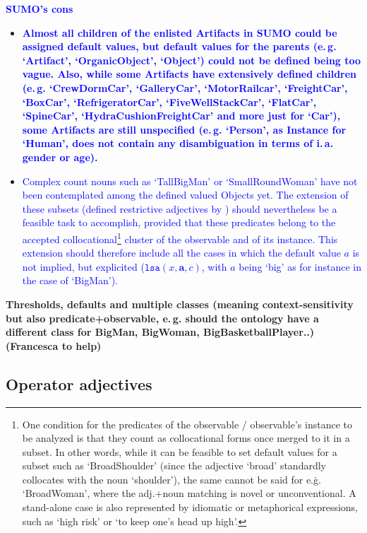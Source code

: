 \documentclass[11pt]{article}
\newcommand{\crossed}{\item[$\times$]}
\begin{document}
\textbf{\textcolor{blue}{SUMO's cons}}
\begin{itemize}
\crossed \textbf{\textcolor{blue}{Almost all children of the enlisted Artifacts in SUMO could be assigned default values, but default values for the parents (e.\,g. `Artifact', `OrganicObject', `Object') could not be defined being too vague. Also, while some Artifacts have extensively defined children (e.\,g. `CrewDormCar', `GalleryCar', `MotorRailcar', `FreightCar', `BoxCar', `RefrigeratorCar', `FiveWellStackCar', `FlatCar', `SpineCar', `HydraCushionFreightCar' and more just for `Car'), some Artifacts are still unspecified (e.\,g. `Person', as Instance for `Human', does not contain any disambiguation in terms of i.\,a. gender or age).}}

\crossed \textcolor{blue}{Complex count nouns such as `TallBigMan' or `SmallRoundWoman' have not been contemplated among the defined valued Objects yet. The extension of these subsets (defined restrictive adjectives by \cite{Bennett06kr}) should nevertheless be a feasible task to accomplish, provided that these predicates belong to the accepted collocational\footnote{One condition for the predicates of the observable / observable's instance to be analyzed is that they count as collocational forms once merged to it in a subset. In other words, while it can be feasible to set default values for a subset such as `BroadShoulder' (since the adjective `broad' standardly collocates with the noun `shoulder'), the same cannot be said for e.\.g. `BroadWoman', where the adj.+noun matching is novel or unconventional. A stand-alone case is also represented by idiomatic or metaphorical expressions, such as `high risk' or `to keep one's head up high'.} cluster of the observable and of its instance. This extension should therefore include all the cases in which the default value \textbf{$a$} is not implied, but explicited ($\texttt{lsa}(x, \textbf{a}, c)$, with \textbf{$a$} being `big' as for instance in the case of `BigMan').}
\end{itemize}


\textbf{Thresholds, defaults and multiple classes (meaning context-sensitivity but also predicate+observable, e.\,g. should the ontology have a different class for BigMan, BigWoman, BigBasketballPlayer..) (Francesca to help)}

\subsection{Operator adjectives}
\end{document}
